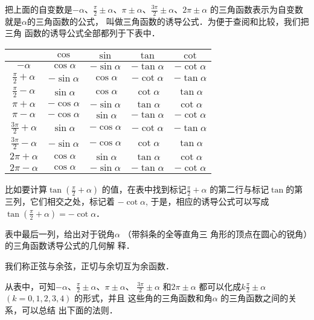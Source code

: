 把上面的自变数是$-\alpha$、$\frac{\pi}{2}\pm\alpha$、$\pi\pm\alpha$、$\frac{3\pi}{2}\pm\alpha$、$2\pi\pm\alpha$
的三角函数表示为自变数就是$\alpha$的三角函数的公式，
叫做三角函数的诱导公式．为便于查阅和比较，我们把三角
函数的诱导公式全部都列于下表中．
\begin{center}
\begin{tabular}{ccccc}
    \hline
& $\cos$ & $\sin$ & $\tan $ &  $\cot$\\
\hline
$-\alpha$& $\cos\alpha$ & $-\sin\alpha$ & $-\tan\alpha $ &  $-\cot\alpha$\\
\vspace{1ex}$\frac{\pi}{2}+\alpha$& $-\sin\alpha$ & $\cos\alpha$ & $-\cot\alpha $ &  $-\tan\alpha$\\
\vspace{1ex}$\frac{\pi}{2}-\alpha$& $\sin\alpha$ & $\cos\alpha$ & $\cot\alpha $ &  $\tan \alpha$\\
$\pi+\alpha$& $-\cos\alpha$ & $-\sin\alpha$ & $\tan\alpha $ &  $\cot\alpha$\\
$\pi-\alpha$& $-\cos\alpha$ & $\sin\alpha$ & $-\tan\alpha $ &  $-\cot\alpha$\\
\vspace{1ex}$\frac{3\pi}{2}+\alpha$& $\sin\alpha$ & $-\cos\alpha$ & $-\cot\alpha $ &  $-\tan\alpha$\\
\vspace{1ex}$\frac{3\pi}{2}-\alpha$& $-\sin\alpha$ & $-\cos\alpha$ & $\cot\alpha $ &  $\tan\alpha$\\
$2\pi+\alpha$& $\cos\alpha$ & $\sin\alpha$ & $\tan\alpha $ &  $\cot\alpha$\\
$2\pi-\alpha$& $\cos\alpha$ & $-\sin\alpha$ & $-\tan\alpha $ &  $-\cot\alpha$\\
\hline
\end{tabular}
\end{center}

比如要计算$\tan\left(\frac{\pi}{2}+\alpha\right)$
的值，在表中找到标记$\frac{\pi}{2}+\alpha$
的第二行与标记$\tan$的第三列，它们相交之处，标记着
$-\cot\alpha$, 于是，相应的诱导公式可以写成
$\tan \left(\frac{\pi}{2}+\alpha\right) =
-\cot\alpha$．

表中最后一列，给出对于锐角$\alpha$ （带斜条的全等直角三
角形的顶点在圆心的锐角）的三角函数诱导公式的几何解
释．

我们称正弦与余弦，正切与余切互为余函数．

从表中，可知$-\alpha$、$\frac{\pi}{2}\pm\alpha$、$\pi \pm\alpha$、
$\frac{3\pi}{2}\pm \alpha$ 和$2\pi \pm\alpha$ 都可以化成$k\frac{\pi}{2}
\pm\alpha$ $(k=0,1,2,3,4)$ 的形式，并且
这些角的三角函数和角$\alpha$ 的三角函数之间的关系，可以总结
出下面的法则．

